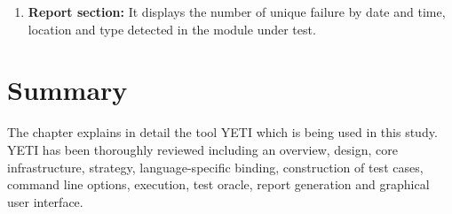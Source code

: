 \begin{enumerate}
\item \textbf{Report section:} It displays the number of unique failure by date and time, location and type detected in the module under test. 
\end{enumerate}


\section{Summary}
The chapter explains in detail the tool YETI which is being used in this study. YETI has been thoroughly reviewed including an overview, design, core infrastructure, strategy, language-specific binding, construction of test cases, command line options, execution, test oracle, report generation and graphical user interface.


